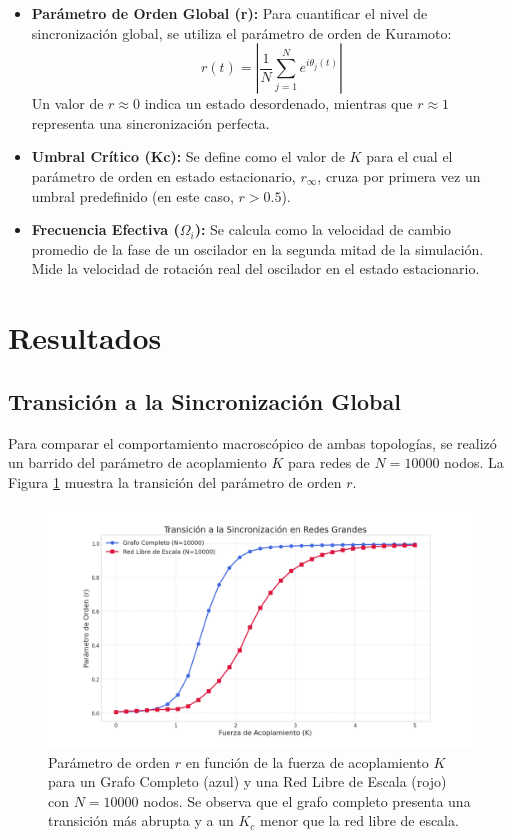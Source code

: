 \documentclass[12pt, a4paper]{article}
\begin{document}
\begin{itemize}
    \item \textbf{Parámetro de Orden Global (r):} Para cuantificar el nivel de sincronización global, se utiliza el parámetro de orden de Kuramoto:
    $$
    r(t) = \left| \frac{1}{N} \sum_{j=1}^{N} e^{i\theta_j(t)} \right|
    $$
    Un valor de \(r \approx 0\) indica un estado desordenado, mientras que \(r \approx 1\) representa una sincronización perfecta.

    \item \textbf{Umbral Crítico (Kc):} Se define como el valor de \(K\) para el cual el parámetro de orden en estado estacionario, \(r_{\infty}\), cruza por primera vez un umbral predefinido (en este caso, \(r > 0.5\)).

    \item \textbf{Frecuencia Efectiva (\(\Omega_i\)):} Se calcula como la velocidad de cambio promedio de la fase de un oscilador en la segunda mitad de la simulación. Mide la velocidad de rotación real del oscilador en el estado estacionario.
\end{itemize}

\section{Resultados}

\subsection{Transición a la Sincronización Global}

Para comparar el comportamiento macroscópico de ambas topologías, se realizó un barrido del parámetro de acoplamiento \(K\) para redes de \(N=10000\) nodos. La Figura \ref{fig:r_vs_k} muestra la transición del parámetro de orden \(r\).

\begin{figure}[h!]
    \centering
    \includegraphics[width=\textwidth]{./img/1.png}
    \caption{Parámetro de orden \(r\) en función de la fuerza de acoplamiento \(K\) para un Grafo Completo (azul) y una Red Libre de Escala (rojo) con \(N=10000\) nodos. Se observa que el grafo completo presenta una transición más abrupta y a un \(K_c\) menor que la red libre de escala.}
    \label{fig:r_vs_k}
\end{figure}
\end{document}

